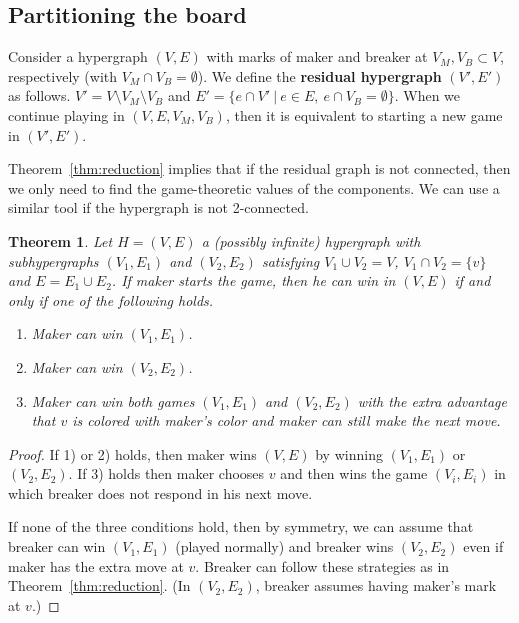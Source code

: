 \documentclass[conference]{IEEEtran}
\newtheorem{theorem}{Theorem}[section]
\theoremstyle{definition}
\begin{document}
\subsection{Partitioning the board}

Consider a hypergraph $(V, E)$ with marks of maker and breaker at $V_M, V_B \subset V$, respectively (with $V_M \cap V_B = \emptyset$). We define the {\bf residual hypergraph} $(V', E')$ as follows. $V' = V \setminus V_M \setminus V_B$ and $E' = \big\{ e \cap V' \ |\ e \in E,\ e \cap V_B = \emptyset \big\}$. When we continue playing in $(V, E, V_M, V_B)$, then it is equivalent to starting a new game in $(V', E')$.

Theorem~\ref{thm:reduction} implies that if the residual graph is not connected, then we only need to find the game-theoretic values of the components. We can use a similar tool if the hypergraph is not 2-connected.  
\begin{theorem}
\label{thm:2-connected}
Let $H = (V, E)$ a (possibly infinite) hypergraph with subhypergraphs $(V_1, E_1)$ and $(V_2, E_2)$ satisfying $V_1 \cup V_2 = V$, $V_1 \cap V_2 = \{v\}$ and $E = E_1 \cup E_2$. If maker starts the game, then he can win in $(V, E)$ if and only if one of the following holds.
\begin{enumerate}
    \item Maker can win $(V_1, E_1)$.
    \item Maker can win $(V_2, E_2)$.
    \item Maker can win both games $(V_1, E_1)$ and $(V_2, E_2)$ with the extra advantage that $v$ is colored with maker's color and maker can still make the next move.
\end{enumerate}
\end{theorem}

\begin{proof}
If 1) or 2) holds, then maker wins $(V, E)$ by winning $(V_1, E_1)$ or $(V_2, E_2)$. If 3) holds then maker chooses $v$ and then wins the game $(V_i, E_i)$ in which breaker does not respond in his next move.

If none of the three conditions hold, then by symmetry, we can assume that breaker can win $(V_1, E_1)$ (played normally) and breaker wins $(V_2, E_2)$ even if maker has the extra move at $v$. Breaker can follow these strategies as in Theorem~\ref{thm:reduction}. (In $(V_2, E_2)$, breaker assumes having maker's mark at $v$.)
\end{proof}
\end{document}
